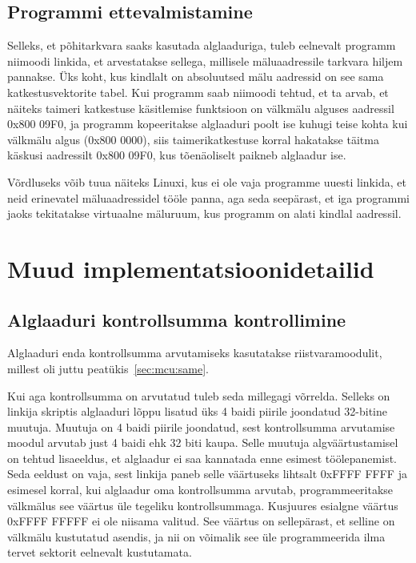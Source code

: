 \documentclass[12pt,a4paper]{article}
\begin{document}
\subsection{Programmi ettevalmistamine}
\label{sec:boot:prep}
Selleks, et põhitarkvara saaks kasutada alglaaduriga, tuleb eelnevalt programm
niimoodi linkida, et arvestatakse sellega, millisele mäluaadressile tarkvara
hiljem pannakse. Üks koht, kus kindlalt on absoluutsed mälu aadressid on see
sama katkestusvektorite tabel. Kui programm saab niimoodi tehtud, et ta arvab,
et näiteks taimeri katkestuse käsitlemise funktsioon on välkmälu alguses
aadressil 0x800 09F0, ja programm kopeeritakse alglaaduri poolt ise kuhugi teise
kohta kui välkmälu algus (0x800 0000), siis taimerikatkestuse korral hakatakse
täitma käskusi aadressilt 0x800 09F0, kus tõenäoliselt paikneb alglaadur ise.

Võrdluseks võib tuua näiteks Linuxi, kus ei ole vaja programme uuesti linkida,
et neid erinevatel mäluaadressidel tööle panna, aga seda seepärast, et iga
programmi jaoks tekitatakse virtuaalne mäluruum, kus programm on alati kindlal
aadressil.

\section{Muud implementatsioonidetailid}
\subsection{Alglaaduri kontrollsumma kontrollimine}
Alglaaduri enda kontrollsumma arvutamiseks kasutatakse riistvaramoodulit,
millest oli juttu peatükis~\ref{sec:mcu:same}.

Kui aga kontrollsumma on arvutatud tuleb seda millegagi võrrelda. Selleks on
linkija skriptis alglaaduri lõppu lisatud üks 4 baidi piirile joondatud
32-bitine muutuja. Muutuja on 4 baidi piirile joondatud, sest kontrollsumma
arvutamise moodul arvutab just 4 baidi ehk 32 biti kaupa. Selle muutuja
algväärtustamisel on tehtud lisaeeldus, et alglaadur ei saa kannatada enne
esimest töölepanemist. Seda eeldust on vaja, sest linkija paneb selle väärtuseks
lihtsalt 0xFFFF FFFF ja esimesel korral, kui alglaadur oma kontrollsumma
arvutab, programmeeritakse välkmälus see väärtus üle tegeliku kontrollsummaga.
Kusjuures esialgne väärtus 0xFFFF FFFFF ei ole niisama valitud. See väärtus on
sellepärast, et selline on välkmälu kustutatud asendis, ja nii on võimalik see
üle programmeerida ilma tervet sektorit eelnevalt kustutamata.
\end{document}
